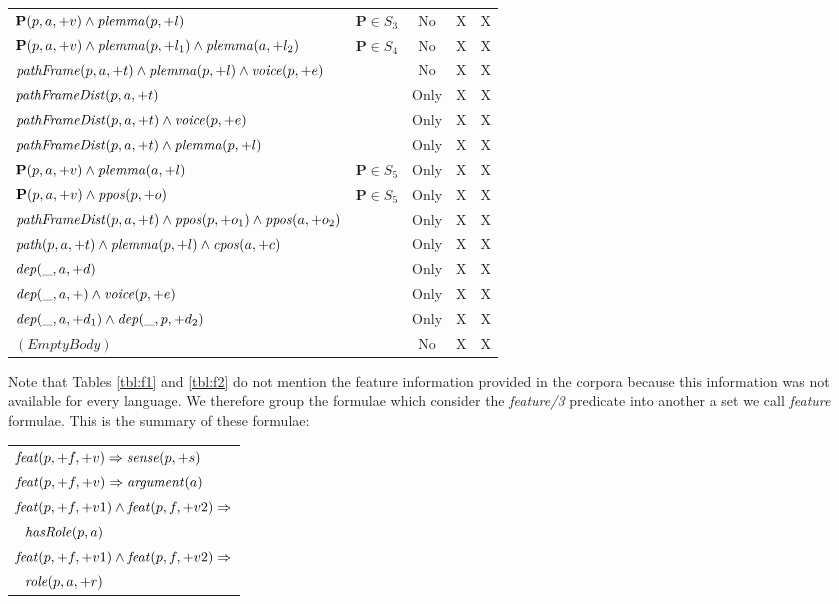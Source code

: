 \begin{table*}[th]
\begin{tabular}{|>{\small}p{10cm}|>{\small}c|>{\small}c|>{\small}c|>{\small}c|}
   $ \mathbf{P}(p,a,+v) \land \mathit{plemma}(p,+l) $ & $\mathbf{P} \in S_3$           & 
   No  & X & X \\
   $ \mathbf{P}(p,a,+v) \land \mathit{plemma}(p,+l_1) \land \mathit{plemma}(a,+l_2) $    &   
   $\mathbf{P} \in S_4$ & No  & X & X \\
   $ \mathit{pathFrame}(p,a,+t) \land \mathit{plemma}(p,+l) \land \mathit{voice}(p,+e) $ &      & No      
   & X & X \\
   $ \mathit{pathFrameDist}(p,a,+t) $      &  & Only   & X & X \\
   $ \mathit{pathFrameDist}(p,a,+t) \land \mathit{voice}(p,+e) $ &  & Only           & X & X \\
   $ \mathit{pathFrameDist}(p,a,+t) \land \mathit{plemma}(p,+l)$ &  & Only           & X & X \\
   $ \mathbf{P}(p,a,+v) \land \mathit{plemma}(a,+l) $ & $\mathbf{P} \in S_5$ & Only         
   & X & X \\
   $ \mathbf{P}(p,a,+v) \land \mathit{ppos}(p,+o) $ & $\mathbf{P} \in S_5$   & Only        
   & X & X \\
   $ \mathit{pathFrameDist}(p,a,+t) \land \mathit{ppos}(p,+o_1) \land \mathit{ppos}(a,+o_2) $ &  & Only           
   & X & X \\
   $ \mathit{path}(p,a,+t) \land \mathit{plemma}(p,+l) \land \mathit{cpos}(a,+c) $ &  & Only          
   & X & X \\
   $ \mathit{dep}(\_,a,+d)$  & & Only  & X & X \\
   $ \mathit{dep}(\_,a,+) \land \mathit{voice}(p,+e)$    &  & Only & X & X  \\
   $ \mathit{dep}(\_,a,+d_1) \land \mathit{dep}(\_,p,+d_2)$    & & Only & X & X  \\
   $ (Empty Body)                $    &                           & No & X & X \\
\hline
\end{tabular}


\caption{Templates of the local formulae for \emph{hasRole/2} and \emph{role/3}.  
H: head of clause is $\hasRole(p,a)$, R: head of clause is $\role(p,a,+r)$ and 
$S_1 = \{ppos,plemma\}, S_2=\{frame, unlabelFrame, path\}, S_3= 
\{frame,pathFrame\},S_4=\{frame,pathFrame,path\}, S_5= \{pathFrameDist, path\} 
$}
\label{tbl:f2}
\end{table*}

Note that Tables \ref{tbl:f1} and \ref{tbl:f2} do not mention the feature information provided in the corpora because 
this information was not available for every language. We therefore group the 
formulae which consider the \emph{feature/3} predicate into another a set we call 
\emph{feature} formulae. This is the summary of these formulae:
\begin{tabular}{p{7.5cm}}
   $ \mathit{feat}(p,+f,+v) \Rightarrow \mathit{sense}(p,+s)    $\\
   $ \mathit{feat}(p,+f,+v) \Rightarrow \mathit{argument}(a)    $\\
   $ \mathit{feat}(p,+f,+v1) \land \mathit{feat}(p,f,+v2) \Rightarrow $\\$\ \ \hasRole(p,a)    
   $\\
   $ \mathit{feat}(p,+f,+v1) \land \mathit{feat}(p,f,+v2) \Rightarrow $\\$\ \ \role(p,a,+r)   
   $\\
\end{tabular}


